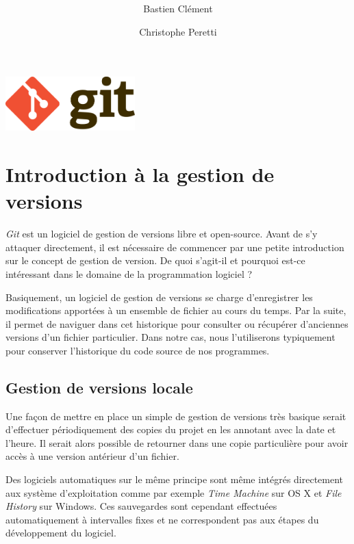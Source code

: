 \documentclass[11pt,a4paper]{article}
\author{Bastien Clément \and Christophe Peretti}
\title{{\normalsize \doccourse} \\ \doctitle }
\begin{document}

\maketitle

\vspace{3cm}
\begin{center}
\includegraphics[width=5cm]{git_logo}
\end{center}

\pagebreak
{}

\tableofcontents

\pagebreak
{}

\section{Introduction à la gestion de versions}

\textit{Git} est un logiciel de gestion de versions libre et open-source.
Avant de s'y attaquer directement, il est nécessaire de commencer par une petite introduction sur le concept de gestion de version.
De quoi s'agit-il et pourquoi est-ce intéressant dans le domaine de la programmation logiciel ?

Basiquement, un logiciel de gestion de versions se charge d'enregistrer les modifications apportées à un ensemble de fichier au cours du temps.
Par la suite, il permet de naviguer dans cet historique pour consulter ou récupérer d'anciennes versions d'un fichier particulier.
Dans notre cas, nous l'utiliserons typiquement pour conserver l'historique du code source de nos programmes.

\subsection{Gestion de versions locale}

Une façon de mettre en place un simple de gestion de versions très basique serait d'effectuer périodiquement des copies du projet en les annotant avec la date et l'heure.
Il serait alors possible de retourner dans une copie particulière pour avoir accès à une version antérieur d'un fichier.

Des logiciels automatiques sur le même principe sont même intégrés directement aux système d'exploitation comme par exemple \textit{Time Machine} sur OS X et \textit{File History} sur Windows.
Ces sauvegardes sont cependant effectuées automatiquement à intervalles fixes et ne correspondent pas aux étapes du développement du logiciel.
\end{document}
